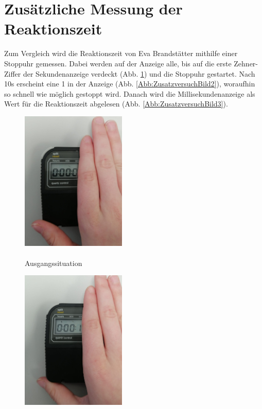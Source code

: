 \documentclass[a4paper,12pt]{article}
\begin{document}
\section{Zusätzliche Messung der Reaktionszeit}

Zum Vergleich wird die Reaktionszeit von Eva Brandstätter mithilfe einer Stoppuhr gemessen.
Dabei werden auf der Anzeige alle, bis auf die erste Zehner-Ziffer der Sekundenanzeige verdeckt (Abb.
\ref{Abb:ZusatzversuchBild1}) und die Stoppuhr gestartet. Nach 10s erscheint eine 1 in der Anzeige
(Abb. \ref{Abb:ZusatzversuchBild2}), woraufhin so schnell wie möglich gestoppt wird. Danach wird
die Millisekundenanzeige als Wert für die Reaktionszeit abgelesen (Abb. \ref{Abb:ZusatzversuchBild3}).

\begin{multicols}{3}
    \begin{figure}[H]
        \centering
        \includegraphics[width=5cm]{bilder/Zusatzversuch_1_export.jpg}
        \caption{\\Ausgangssituation}
        \label{Abb:ZusatzversuchBild1}
    \end{figure}
    \columnbreak
    \begin{figure}[H]
        \centering
        \includegraphics[width=5cm]{bilder/Zusatzversuch_2_export.jpg}

\end{figure}
\end{multicols}
\end{document}
